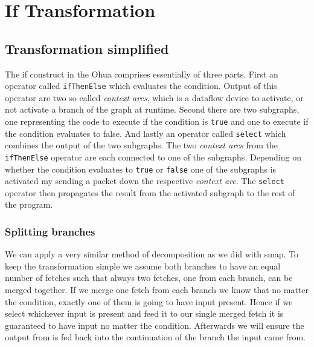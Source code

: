 \chapter{If Transformation}

\label{ch:if-transformation}

\newcommand{\opite}{\texttt{ifThenElse}}
\newcommand{\opselect}{\texttt{select}}


\section{Transformation simplified}


The if construct in the Ohua comprises essentially of three parts.
First an operator called \texttt{ifThenElse} which evaluates the condition.
Output of this operator are two so called \emph{context arcs}, which is a dataflow device to activate, or not activate a branch of the graph at runtime.
Second there are two subgraphs, one representing the code to execute if the condition is \texttt{true} and one to execute if the condition evaluates to false.
And lastly an operator called \texttt{select} which combines the output of the two subgraphs.
The two \emph{context arcs} from the \texttt{ifThenElse} operator are each connected to one of the subgraphs.
Depending on whether the condition evaluates to \texttt{true} or \texttt{false} one of the subgraphs is activated my sending a packet down the respective \emph{context arc}.
The \texttt{select} operator then propagates the result from the activated subgraph to the rest of the program.


\subsection{Splitting branches}

We can apply a very similar method of decomposition as we did with smap.
To keep the transformation simple we assume both branches to have an equal number of fetches such that always two fetches, one from each branch, can be merged together.
If we merge one fetch from each branch we know that no matter the condition, exactly one of them is going to have input present.
Hence if we select whichever input is present and feed it to our single merged fetch it is guaranteed to have input no matter the condition.
Afterwards we will ensure the output from \fetch{} is fed back into the continuation of the branch the input came from.

